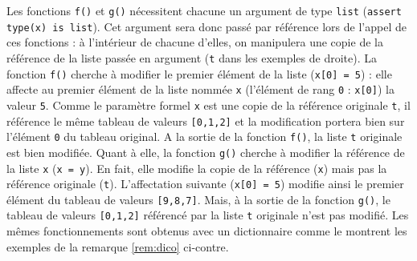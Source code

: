 \noindent Les fonctions {\tt f()} et {\tt g()} nécessitent chacune un argument 
de type {\tt list} ({\tt assert type(x) is list}).
Cet argument sera donc passé par référence lors de l'appel de ces fonctions :
à l'intérieur de chacune d'elles, on manipulera une copie de la référence de la liste 
passée en argument ({\tt t} dans les exemples de droite). 
La fonction {\tt f()} cherche à modifier
le premier élément de la liste ({\tt x[0] = 5}) : elle affecte au premier
élément de la liste nommée {\tt x} (l'élément de rang {\tt 0} : {\tt x[0]}) 
la valeur {\tt 5}. Comme le paramètre formel {\tt x} est une copie de la
référence originale {\tt t}, il référence le même tableau de valeurs {\tt [0,1,2]}
et la modification portera bien sur l'élément {\tt 0} du tableau original.
A la sortie de la fonction {\tt f()}, la liste {\tt t} originale est bien modifiée.
Quant à elle, la fonction {\tt g()} cherche à modifier la référence de la liste
{\tt x} ({\tt x = y}). En fait, elle modifie la copie de la référence ({\tt x})
mais pas la référence originale ({\tt t}). L'affectation suivante ({\tt x[0] = 5})
modifie ainsi le premier élément du tableau de valeurs {\tt [9,8,7]}.
Mais, à la sortie de la fonction {\tt g()},
le tableau de valeurs {\tt [0,1,2]} référencé par la liste {\tt t} originale 
n'est pas modifié.
Les mêmes fonctionnements sont obtenus avec un dictionnaire comme le montrent
les exemples de la remarque \ref{rem:dico} ci-contre.




